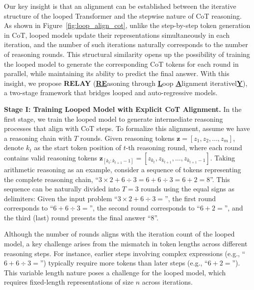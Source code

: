 
Our key insight is that an alignment can be established between the iterative structure of the looped Transformer and the stepwise nature of CoT reasoning. As shown in Figure~\ref{fig:loop_align_cot}, unlike the step-by-step token generation in CoT, looped models update their representations simultaneously in each iteration, and the number of such iterations naturally corresponds to the number of reasoning rounds. This structural similarity opens up the possibility of training the looped model to generate the corresponding CoT tokens for each round in parallel, while maintaining its ability to predict the final answer. With this insight, we propose \textbf{RELAY} (\underline{\textbf{RE}}asoning through \underline{\textbf{L}}oop \underline{\textbf{A}}lignment iterativel\underline{\textbf{Y}}), a two-stage framework that bridges looped and auto-regressive models.


\textbf{Stage I: Training Looped Model with Explicit CoT Alignment.}
In the first stage, we train the looped model to generate intermediate reasoning processes that align with CoT steps. To formalize this alignment, assume we have a reasoning chain with $T$ rounds. Given reasoning tokens $\bm{z}=[z_1, z_2, \ldots, z_m]$, denote $k_t$ as the start token position of $t$-th reasoning round, where each round contains valid reasoning tokens $\bm{z}_{[k_t:k_{t+1}-1]}=[z_{k_t}, z_{k_{t+1}}, \ldots, z_{k_{t+1}-1}]$.  Taking arithmetic reasoning as an example, consider a sequence of tokens representing the complete reasoning chain, ``$3\times 2 + 6 \div 3 = 6 + 6 \div 3 = 6 + 2 = 8$''. This sequence can be naturally divided into $T=3$ rounds using the equal signs as delimiters: Given the input problem ``$3\times 2 + 6 \div 3 =$'', the first round corresponds to ``$6 + 6 \div 3 = $'', the second round corresponds to ``$6 + 2 = $'', and the third (last) round presents the final answer ``$8$''. 


Although the number of rounds aligns with the iteration count of the looped model, a key challenge arises from the mismatch in token lengths across different reasoning steps. For instance, earlier steps involving complex expressions (e.g., ``$6 + 6 \div 3 = $'') typically require more tokens than later steps (e.g., ``$6 + 2 = $''). This variable length nature poses a challenge for the looped model, which requires fixed-length representations of size $n$ across iterations.


